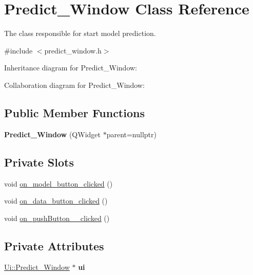 \hypertarget{class_predict___window}{}\section{Predict\+\_\+\+Window Class Reference}
\label{class_predict___window}


The class responsible for start model prediction.  




{\ttfamily \#include $<$predict\+\_\+window.\+h$>$}



Inheritance diagram for Predict\+\_\+\+Window\+:


Collaboration diagram for Predict\+\_\+\+Window\+:
\subsection*{Public Member Functions}
\begin{DoxyCompactItemize}
\item 
\mbox{\label{class_predict___window_a3393ac1ddc257b0cc9b5cd0443a18fb8}} 
{\bfseries Predict\+\_\+\+Window} (Q\+Widget $\ast$parent=nullptr)
\end{DoxyCompactItemize}
\subsection*{Private Slots}
\begin{DoxyCompactItemize}
\item 
void \hyperlink{class_predict___window_a515cd0039c4f7baff0d55af7e290403e}{on\+\_\+model\+\_\+button\+\_\+clicked} ()
\item 
void \hyperlink{class_predict___window_a3b6a721c8baee978c72a5b2895d27be5}{on\+\_\+data\+\_\+button\+\_\+clicked} ()
\item 
void \hyperlink{class_predict___window_a4b99e969bf0485922ee03081503e019a}{on\+\_\+push\+Button\+\_\+\_\+clicked} ()
\end{DoxyCompactItemize}
\subsection*{Private Attributes}
\begin{DoxyCompactItemize}
\item 
\mbox{\label{class_predict___window_aa8b4b5cc8c59bbe10e4fe549ef5d51ee}} 
\hyperlink{class_ui_1_1_predict___window}{Ui\+::\+Predict\+\_\+\+Window} $\ast$ {\bfseries ui}
\end{DoxyCompactItemize}


